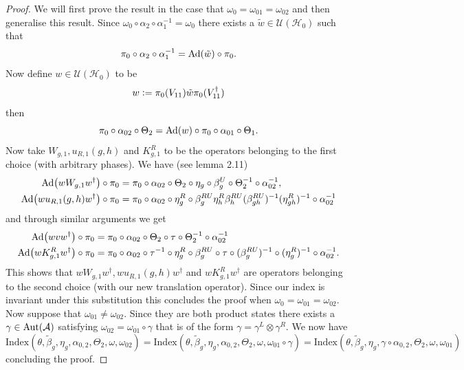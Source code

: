 \documentclass[12pt,a4paper,twoside]{article}
\newcommand{\defeq}{\vcentcolon=}
\let\originalleft\left
\let\originalright\right
\renewcommand{\left}{\mathopen{}\mathclose\bgroup\originalleft}
\renewcommand{\right}{\aftergroup\egroup\originalright}
\newcommand{\UU}{\mathcal U}
\newcommand{\HH}{\mathcal H}
\renewcommand{\AA}{\mathcal A}
\newcommand{\Ad}[1]{\textrm{Ad}\left(#1\right)}
\newcommand{\Aut}[1]{\textrm{Aut}\left(#1\right)}
\theoremstyle{definition}
\numberwithin{equation}{section}
\begin{document}
\begin{proof}
	We will first prove the result in the case that $\omega_0=\omega_{01}=\omega_{02}$ and then generalise this result. Since $\omega_0\circ\alpha_2\circ\alpha_1^{-1}=\omega_0$ there exists a $\tilde{w}\in\UU(\HH_0)$ such that
	\begin{equation}
		\pi_0\circ\alpha_2\circ\alpha_1^{-1}=\Ad{\tilde{w}}\circ\pi_0.
	\end{equation}
	Now define $w\in\UU(\HH_0)$ to be
	\begin{equation}
		w\defeq \pi_0(V_{11})\tilde{w} \pi_0(V_{11}^\dagger)
	\end{equation}
	then
	\begin{equation}
		\pi_0\circ\alpha_{02}\circ\Theta_2=\Ad{w}\circ\pi_0\circ\alpha_{01}\circ\Theta_1.
	\end{equation}
	Now take $W_{g,1},u_{R,1}(g,h)$ and $K^R_{g,1}$ to be the operators belonging to the first choice (with arbitrary phases). 
	We have (see \cite{ogata2021h3gmathbb} lemma 2.11)
	\begin{align}
		\Ad{wW_{g,1}w^\dagger}\circ\pi_0&=\pi_0\circ \alpha_{02}\circ\Theta_2\circ\eta_g\circ\beta_g^U\circ\Theta_2^{-1}\circ\alpha_{02}^{-1},\\
		\Ad{wu_{R,1}(g,h)w^\dagger}\circ\pi_0&=\pi_0\circ \alpha_{02}\circ\eta_g^R\circ\beta_g^{RU}\eta_h^R\beta_{h}^{RU}(\beta_{gh}^{RU})^{-1}(\eta_{gh}^R)^{-1}\circ\alpha_{02}^{-1}
	\end{align}
	and through similar arguments we get
	\begin{align}
		\Ad{wvw^\dagger}\circ\pi_0&=\pi_0\circ\alpha_{02}\circ\Theta_2\circ\tau\circ\Theta_2^{-1}\circ\alpha_{02}^{-1}\\
		\Ad{wK^R_{g,1}w^\dagger}\circ\pi_0&=\pi_0\circ \alpha_{02}\circ\tau^{-1}\circ\eta_g^R\circ\beta_g^{RU}\circ\tau\circ(\beta_g^{RU})^{-1}\circ(\eta^R_g)^{-1}\circ\alpha_{02}^{-1}.
	\end{align}
	This shows that $wW_{g,1}w^\dagger,wu_{R,1}(g,h)w^\dagger$ and $wK^R_{g,1}w^\dagger$ are operators belonging to the second choice (with our new translation operator). Since our index is invariant under this substitution this concludes the proof when $\omega_0=\omega_{01}=\omega_{02}$. Now suppose that $\omega_{01}\neq\omega_{02}$. Since they are both product states there exists a $\gamma\in\Aut{\AA}$ satisfying $\omega_{02}=\omega_{01}\circ\gamma$ that is of the form $\gamma=\gamma^L\otimes\gamma^R$. We now have
	\begin{equation}
		\textrm{Index}(\theta,\tilde{\beta}_g,\eta_g,\alpha_{0,2},\Theta_2,\omega,\omega_{02})=\textrm{Index}(\theta,\tilde{\beta}_g,\eta_g,\alpha_{0,2},\Theta_2,\omega,\omega_{01}\circ\gamma)=\textrm{Index}(\theta,\tilde{\beta}_g,\eta_g,\gamma\circ\alpha_{0,2},\Theta_2,\omega,\omega_{01})
	\end{equation}
	concluding the proof.
\end{proof}
\end{document}
